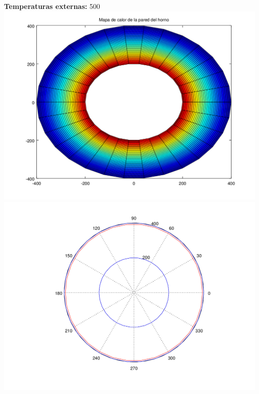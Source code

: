 	\textbf{Temperaturas externas: } 500\\
	\includegraphics[scale=0.35]{experimentos1a_1b/evolucion_isoterma_cambios_temperatura_varias_discretizaciones/test22_030_radios_030_angulos_inst_001_heatmap.png}
	\includegraphics[scale=0.35]{experimentos1a_1b/evolucion_isoterma_cambios_temperatura_varias_discretizaciones/test22_030_radios_030_angulos_inst_001_isomap.png}

